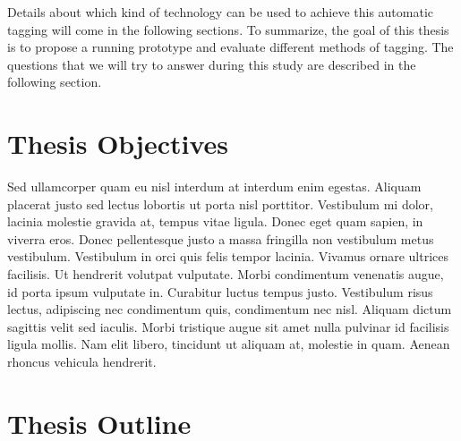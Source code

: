 Details about which kind of technology can be 	used to achieve this automatic tagging will come in the following sections. To summarize, the goal of this thesis is to propose a running prototype and evaluate different methods of tagging. The questions that we will try to answer during this study are described in the following section.

\section{Thesis Objectives}

Sed ullamcorper quam eu nisl interdum at interdum enim egestas. Aliquam placerat justo sed lectus lobortis ut porta nisl porttitor. Vestibulum mi dolor, lacinia molestie gravida at, tempus vitae ligula. Donec eget quam sapien, in viverra eros. Donec pellentesque justo a massa fringilla non vestibulum metus vestibulum. Vestibulum in orci quis felis tempor lacinia. Vivamus ornare ultrices facilisis. Ut hendrerit volutpat vulputate. Morbi condimentum venenatis augue, id porta ipsum vulputate in. Curabitur luctus tempus justo. Vestibulum risus lectus, adipiscing nec condimentum quis, condimentum nec nisl. Aliquam dictum sagittis velit sed iaculis. Morbi tristique augue sit amet nulla pulvinar id facilisis ligula mollis. Nam elit libero, tincidunt ut aliquam at, molestie in quam. Aenean rhoncus vehicula hendrerit.

\section{Thesis Outline}

